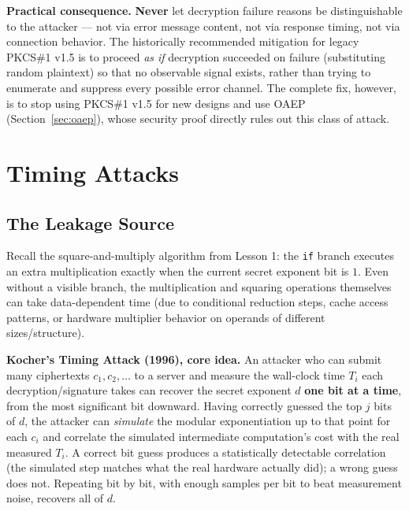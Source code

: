 \medskip\noindent\textbf{Practical consequence.} \textbf{Never} let decryption failure reasons be distinguishable to the attacker — not via error message content, not via response timing, not via connection behavior. The historically recommended mitigation for legacy PKCS\#1 v1.5 is to proceed \emph{as if} decryption succeeded on failure (substituting random plaintext) so that no observable signal exists, rather than trying to enumerate and suppress every possible error channel. The complete fix, however, is to stop using PKCS\#1 v1.5 for new designs and use OAEP (Section~\ref{sec:oaep}), whose security proof directly rules out this class of attack.

\newpage
\section{Timing Attacks}

\subsection{The Leakage Source}

Recall the square-and-multiply algorithm from Lesson 1: the \texttt{if} branch executes an extra multiplication exactly when the current secret exponent bit is $1$. Even without a visible branch, the multiplication and squaring operations themselves can take data-dependent time (due to conditional reduction steps, cache access patterns, or hardware multiplier behavior on operands of different sizes/structure).

\medskip\noindent\textbf{Kocher's Timing Attack (1996), core idea.} An attacker who can submit many ciphertexts $c_1, c_2, \dots$ to a server and measure the wall-clock time $T_i$ each decryption/signature takes can recover the secret exponent $d$ \textbf{one bit at a time}, from the most significant bit downward. Having correctly guessed the top $j$ bits of $d$, the attacker can \emph{simulate} the modular exponentiation up to that point for each $c_i$ and correlate the simulated intermediate computation's cost with the real measured $T_i$. A correct bit guess produces a statistically detectable correlation (the simulated step matches what the real hardware actually did); a wrong guess does not. Repeating bit by bit, with enough samples per bit to beat measurement noise, recovers all of $d$.

